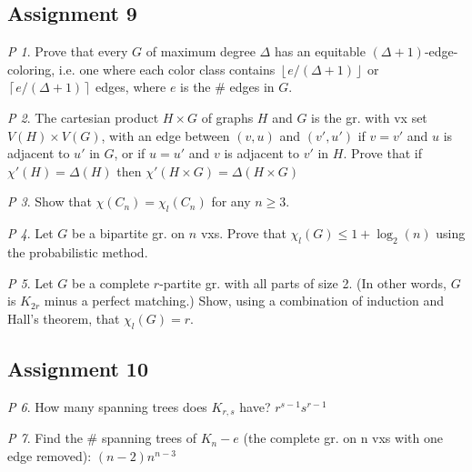 \documentclass[11pt, fleqn, a4paper, landscape]{article}
\theoremstyle{plain} %
\theoremstyle{remark} %
\newtheorem{problem}{P}
\theoremstyle{definition} %
\begin{document}
\begin{multicols}{5}
\subsection{Assignment 9}

\begin{problem}
Prove that every $G$ of maximum degree $\Delta$ has an equitable $(\Delta + 1)$-edge-coloring, i.e. one where each color class contains $\left\lfloor e/(\Delta + 1)\right\rfloor$ or $\left\lceil e/(\Delta + 1)\right\rceil$ edges, where $e$ is the \# edges in $G$.
\end{problem}

\begin{problem}
The cartesian product $H \times G $ of graphs $H$ and $G$ is the gr. with vx set $V (H)\times V (G)$, with an edge between $(v, u)$ and $(v', u')$ if $v = v'$ and $u$ is adjacent to $u'$ in $G$, or
if $u = u'$ and $v$ is adjacent to $v'$ in $H$. Prove that if $\chi'(H) = \Delta(H)$ then $\chi'(H\times G) = \Delta(H\times G)$
\end{problem}

\begin{problem}
Show that $\chi(C_n) = \chi_l(C_n)$ for any $n \ge 3$.
\end{problem}

\begin{problem}
Let $G$ be a bipartite gr. on $n$ vxs. Prove that $\chi_l(G)\le 1 + \log_2(n)$ using the probabilistic method.
\end{problem}

\begin{problem}
Let $G$ be a complete $r$-partite gr. with all parts of size 2. (In other words, $G$ is $K_{2r}$ minus a perfect matching.) Show, using a combination of induction and Hall's theorem, that $\chi_l(G) = r$.
\end{problem}

\subsection{Assignment 10}

\begin{problem}
How many spanning trees does $K_{r,s}$ have? $r^{s-1}s^{r-1}$
\end{problem}

\begin{problem}
Find the \# spanning trees of $K_n- e$ (the complete gr. on n vxs with one edge removed): $(n-2)n^{n-3}$
\end{problem}


\end{multicols}
\end{document}
